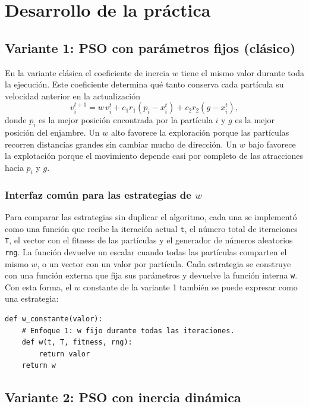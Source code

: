 \section{Desarrollo de la práctica}
\subsection{Variante 1: PSO con parámetros fijos (clásico)}
En la variante clásica el coeficiente de inercia $w$ tiene el mismo valor durante toda la ejecución. Este coeficiente determina qué tanto conserva cada partícula su velocidad anterior en la actualización
\begin{equation}
v_i^{t+1} = w\,v_i^{t} + c_1 r_1 \left(p_i - x_i^{t}\right) + c_2 r_2 \left(g - x_i^{t}\right),
\label{eq:velocidad}
\end{equation}
donde $p_i$ es la mejor posición encontrada por la partícula $i$ y $g$ es la mejor posición del enjambre. Un $w$ alto favorece la exploración porque las partículas recorren distancias grandes sin cambiar mucho de dirección. Un $w$ bajo favorece la explotación porque el movimiento depende casi por completo de las atracciones hacia $p_i$ y $g$.

\subsubsection{Interfaz común para las estrategias de \texorpdfstring{$w$}{w}}

Para comparar las estrategias sin duplicar el algoritmo, cada una se implementó como una función que recibe la iteración actual \texttt{t}, el número total de iteraciones \texttt{T}, el vector con el fitness de las partículas y el generador de números aleatorios \texttt{rng}. La función devuelve un escalar cuando todas las partículas comparten el mismo $w$, o un vector con un valor por partícula. Cada estrategia se construye con una función externa que fija sus parámetros y devuelve la función interna \texttt{w}. Con esta forma, el $w$ constante de la variante 1 también se puede expresar como una estrategia:

\begin{lstlisting}[emph={w_constante, w}, caption={Estrategia de $w$ constante (variante 1)}]
def w_constante(valor):
    # Enfoque 1: w fijo durante todas las iteraciones.
    def w(t, T, fitness, rng):
        return valor
    return w
\end{lstlisting}

\subsection{Variante 2: PSO con inercia dinámica}
\label{subsec:inercia_dinamica}

